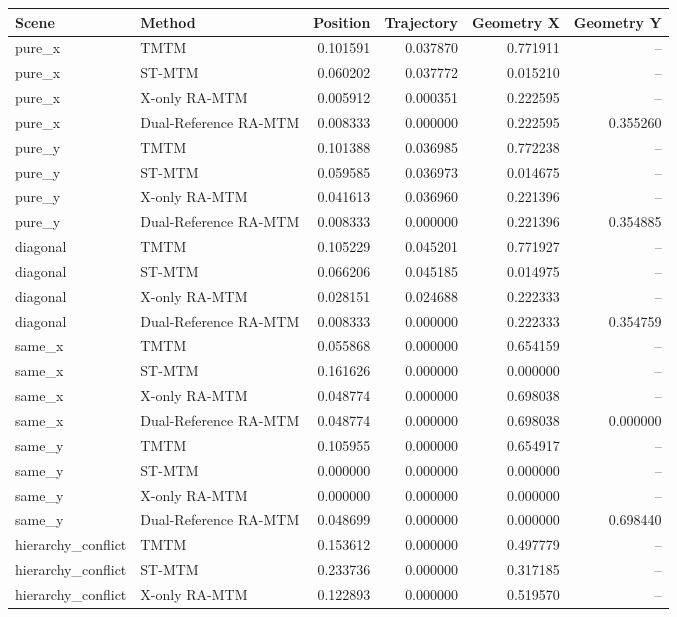 \begin{tabular}{llrrrr}
Scene & Method & Position & Trajectory & Geometry X & Geometry Y \\
\hline
pure\_x & TMTM & 0.101591 & 0.037870 & 0.771911 & -- \\
pure\_x & ST-MTM & 0.060202 & 0.037772 & 0.015210 & -- \\
pure\_x & X-only RA-MTM & 0.005912 & 0.000351 & 0.222595 & -- \\
pure\_x & Dual-Reference RA-MTM & 0.008333 & 0.000000 & 0.222595 & 0.355260 \\
pure\_y & TMTM & 0.101388 & 0.036985 & 0.772238 & -- \\
pure\_y & ST-MTM & 0.059585 & 0.036973 & 0.014675 & -- \\
pure\_y & X-only RA-MTM & 0.041613 & 0.036960 & 0.221396 & -- \\
pure\_y & Dual-Reference RA-MTM & 0.008333 & 0.000000 & 0.221396 & 0.354885 \\
diagonal & TMTM & 0.105229 & 0.045201 & 0.771927 & -- \\
diagonal & ST-MTM & 0.066206 & 0.045185 & 0.014975 & -- \\
diagonal & X-only RA-MTM & 0.028151 & 0.024688 & 0.222333 & -- \\
diagonal & Dual-Reference RA-MTM & 0.008333 & 0.000000 & 0.222333 & 0.354759 \\
same\_x & TMTM & 0.055868 & 0.000000 & 0.654159 & -- \\
same\_x & ST-MTM & 0.161626 & 0.000000 & 0.000000 & -- \\
same\_x & X-only RA-MTM & 0.048774 & 0.000000 & 0.698038 & -- \\
same\_x & Dual-Reference RA-MTM & 0.048774 & 0.000000 & 0.698038 & 0.000000 \\
same\_y & TMTM & 0.105955 & 0.000000 & 0.654917 & -- \\
same\_y & ST-MTM & 0.000000 & 0.000000 & 0.000000 & -- \\
same\_y & X-only RA-MTM & 0.000000 & 0.000000 & 0.000000 & -- \\
same\_y & Dual-Reference RA-MTM & 0.048699 & 0.000000 & 0.000000 & 0.698440 \\
hierarchy\_conflict & TMTM & 0.153612 & 0.000000 & 0.497779 & -- \\
hierarchy\_conflict & ST-MTM & 0.233736 & 0.000000 & 0.317185 & -- \\
hierarchy\_conflict & X-only RA-MTM & 0.122893 & 0.000000 & 0.519570 & -- \\

\end{tabular}
